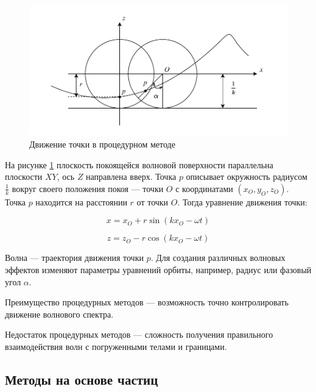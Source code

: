 \begin{figure}[H]
	\begin{center}
		\includegraphics[scale=0.8]{img/procedure.pdf}
	\end{center}
	\captionsetup{justification=centering}
	\caption{Движение точки в процедурном методе}
	\label{img:procedure}
\end{figure}

На рисунке \ref{img:procedure} плоскость покоящейся волновой поверхности параллельна плоскости $XY$, ось $Z$ направлена вверх. Точка $p$ описывает окружность радиусом $\frac{1}{k}$ вокруг своего положения покоя --- точки $O$ с координатами $(x_{O}, y_{O}, z_{O})$. Точка $p$ находится на расстоянии $r$ от точки $O$. Тогда уравнение движения точки:

\begin{equation}
    \label{x}
    x = x_{O} + r\sin (kx_{O} - \omega t)
\end{equation}

\begin{equation}
    \label{z}
    z = z_{O} - r\cos (kx_{O} - \omega t)
\end{equation}

Волна --- траектория движения точки $p$. Для создания различных волновых эффектов изменяют параметры уравнений орбиты, например, радиус или фазовый угол $\alpha$.

Преимущество процедурных методов --- возможность точно контролировать движение волнового спектра.

Недостаток процедурных методов --- сложность получения правильного взаимодействия волн с погруженными телами и границами.  

\subsection{Методы на основе частиц}

